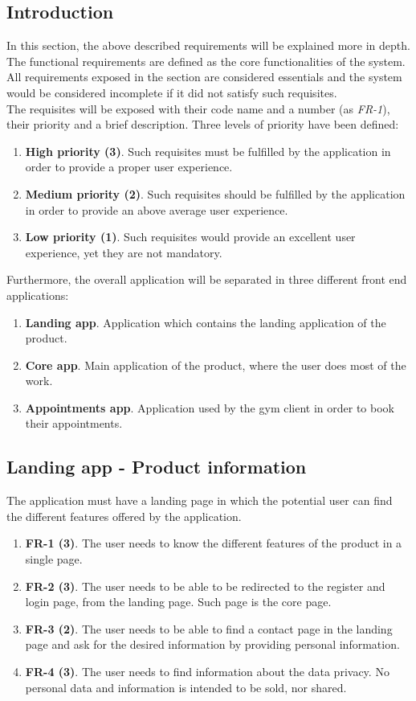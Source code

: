 \documentclass[a4paper, 12pt, oneside]{book}
\begin{document}
\subsection{Introduction}
In this section, the above described requirements will be explained more in depth. The functional requirements are defined as the core functionalities of the system. All requirements exposed in the section are considered essentials and the system would be considered incomplete if it did not satisfy such requisites.
\\[8pt]
The requisites will be exposed with their code name and a number (as \emph{FR-1}), their priority and a brief description. Three levels of priority have been defined:
\begin{enumerate}[label = \arabic{*}.]
	\item \textbf{High priority (3)}. Such requisites must be fulfilled by the application in order to provide a proper user experience.
	\item \textbf{Medium priority (2)}. Such requisites should be fulfilled by the application in order to provide an above average user experience.
	\item \textbf{Low priority (1)}. Such requisites would provide an excellent user experience, yet they are not mandatory.
\end{enumerate}
Furthermore, the overall application will be separated in three different front end applications:
\begin{enumerate}[label = \textbf{\arabic{*}.}]
	\item \textbf{Landing app}. Application which contains the landing application of the product.
	\item \textbf{Core app}. Main application of the product, where the user does most of the work.
	\item \textbf{Appointments app}. Application used by the gym client in order to book their appointments.
\end{enumerate}
\subsection{Landing app - Product information}
The application must have a landing page in which the potential user can find the different features offered by the application.
\begin{enumerate}[label = -]
	\item \textbf{FR-1 (3)}. The user needs to know the different features of the product in a single page.
	\item \textbf{FR-2 (3)}. The user needs to be able to be redirected to the register and login page, from the landing page. Such page is the core page.
	\item \textbf{FR-3 (2)}. The user needs to be able to find a contact page in the landing page and ask for the desired information by providing personal information.
	\item \textbf{FR-4 (3)}. The user needs to find information about the data privacy. No personal data and information is intended to be sold, nor shared.
\end{enumerate}
\end{document}
